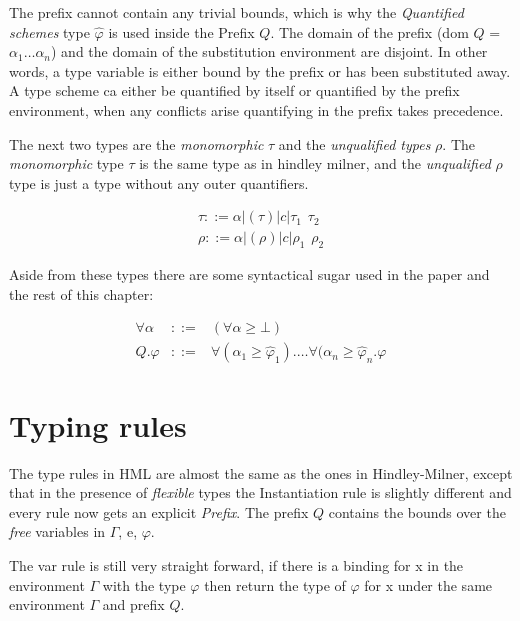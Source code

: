 The prefix cannot contain any trivial bounds, which is why the \emph{Quantified schemes} type $\hat{\varphi}$ is used inside the Prefix $Q$. The domain of the prefix (dom $Q$ = ${\alpha_1 \ldots \alpha_n}$) and the domain of the substitution environment are disjoint. In other words, a type variable is either bound by the prefix or has been substituted away. A type scheme ca either be quantified by itself or quantified by the prefix environment, when any conflicts arise quantifying in the prefix takes precedence.

The next two types are the \emph{monomorphic} $\tau$ and the \emph{unqualified types} $\rho$. The \emph{monomorphic} type $\tau$ is the same type as in hindley milner, and the \emph{unqualified} $\rho$ type is just a type without any outer quantifiers. 

\begin{eqnarray*}
\tau ::= \alpha | (\tau) | c | \tau_1 \hspace{5pt} \tau_2 \\
\rho ::= \alpha | (\rho) | c | \rho_1 \hspace{5pt} \rho_2
\end{eqnarray*}

Aside from these types there are some syntactical sugar used in the paper and the rest of this chapter:

\begin{eqnarray*}
\forall \alpha & ::= & (\forall \alpha \geq \bot) \\
Q.\varphi & ::= & \forall(\alpha_1 \geq \hat{\varphi}_1). \ldots \forall(\alpha_n \geq \hat{\varphi}_n . \varphi
\end{eqnarray*}

\section{Typing rules}
The type rules in HML are almost the same as the ones in Hindley-Milner, except that in the presence of \textit{flexible} types the Instantiation rule is slightly different and every rule now gets an explicit \textit{Prefix}. The prefix $Q$ contains the bounds over the \emph{free} variables in $\Gamma$, e, $\varphi$.

\begin{prooftree}
\end{prooftree}

The var rule is still very straight forward, if there is a binding for x in the environment $\Gamma$ with the type $\varphi$ then return the type of $\varphi$ for x under the same environment $\Gamma$ and prefix $Q$.

